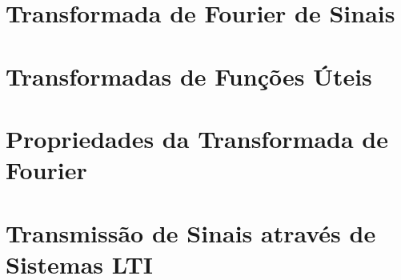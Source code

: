 
\section{Transformada de Fourier de Sinais}


\section{Transformadas de Funções Úteis}


\section{Propriedades da Transformada de Fourier}


\section{Transmissão de Sinais através de Sistemas LTI}


% 

